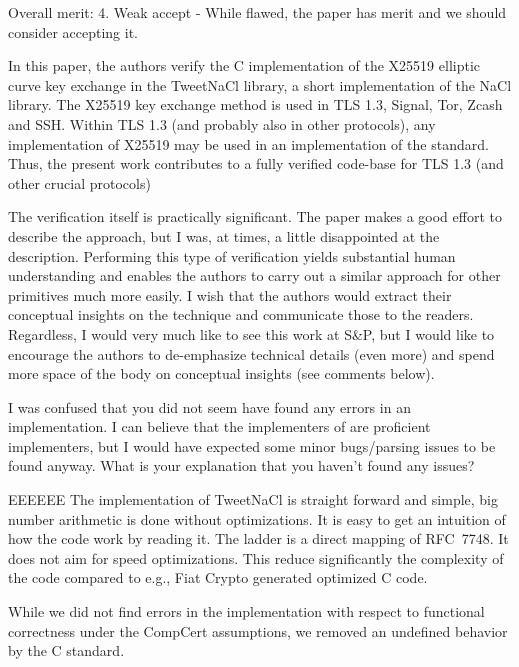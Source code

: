 Overall merit: 4. Weak accept - While flawed, the paper has
merit and we should consider accepting it.


\begin{center}
\end{center}

In this paper, the authors verify the C implementation of the
X25519 elliptic curve key exchange in the TweetNaCl library,
a short implementation of the NaCl library. The X25519 key
exchange method is used in TLS 1.3, Signal, Tor, Zcash and
SSH. Within TLS 1.3 (and probably also in other protocols),
any implementation of X25519 may be used in an implementation
of the standard. Thus, the present work contributes
to a fully verified code-base for TLS 1.3 (and other crucial
protocols)

The verification itself is practically significant. The paper
makes a good effort to describe the approach, but I was, at
times, a little disappointed at the description. Performing this
type of verification yields substantial human understanding
and enables the authors to carry out a similar approach for
other primitives much more easily. I wish that the authors
would extract their conceptual insights on the technique and
communicate those to the readers. Regardless, I would very
much like to see this work at S\&P, but I would like to encourage
the authors to de-emphasize technical details (even more)
and spend more space of the body on conceptual insights (see
comments below).


\begin{center}
\end{center}

I was confused that you did not seem have found any errors
in an implementation. I can believe that the implementers
of \cite{BGJ+15} are proficient implementers, but I would have expected
some minor bugs/parsing issues to be found anyway. What is
your explanation that you haven’t found any issues?

\begin{answer}{EEEEEE}
  The implementation of TweetNaCl is straight forward and
  simple, big number arithmetic is done without optimizations.
  It is easy to get an intuition of how the code work by reading
  it. The ladder is a direct mapping of RFC~7748. It does
  not aim for speed optimizations. This reduce significantly
  the complexity of the code compared to e.g., Fiat Crypto
  generated optimized C code.

  While we did not find errors in the implementation with
  respect to functional correctness under the CompCert assumptions,
  we removed an undefined behavior by the C
  standard.
\end{answer}

